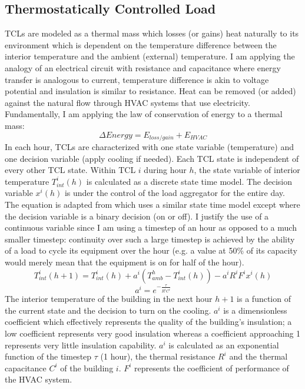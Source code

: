 \documentclass[journal]{IEEEtran}
\begin{document}
\subsection{Thermostatically Controlled Load}
TCLs are modeled as a thermal mass which losses (or gains) heat naturally to its environment which is dependent on the temperature difference between the interior temperature and the ambient (external) temperature. I am applying the analogy of an electrical circuit with resistance and capacitance where energy transfer is analogous to current, temperature difference is akin to voltage potential and insulation is similar to resistance. Heat can be removed (or added) against the natural flow through HVAC systems that use electricity. Fundamentally, I am applying the law of conservation of energy to a thermal mass:
\[\Delta Energy = E_{loss/gain}+E_{HVAC}\]
In each hour, TCLs are characterized with one state variable (temperature) and one decision variable (apply cooling if needed). Each TCL state is independent of every other TCL state. Within TCL \(i\) during hour \(h\), the state variable of  interior temperature \(T_{int}^{i}(h)\) is calculated as a discrete state time model. The decision variable \(x^i(h)\) is under the control of the load aggregator for the entire day. The equation is adapted from \cite{Cal} which uses a similar state time model except where the decision variable is a binary decision (on or off). I justify the use of a continuous variable since I am using a timestep of an hour as opposed to a much smaller timestep: continuity over such a large timestep is achieved by the ability of a load to cycle its equipment over the hour (e.g. a value at 50\% of its capacity would merely mean that the equipment is on for half of the hour).
\[ T_{int}^{i}(h+1)=T_{int}^{i}(h)+a^i(T_{amb}^{h}-T_{int}^{i}(h))-a^iR^iF^ix^i(h)\]
\[a^i=e^{-\frac{\tau}{R^iC^i}}\]
The interior temperature of the building in the next hour \(h+1\) is a function of the current state and the decision to turn on the cooling. \(a^i\) is a dimensionless coefficient which effectively represents the quality of the building's insulation; a low coefficient represents very good insulation whereas a coefficient approaching 1 represents very little insulation capability. \(a^i\) is calculated as an exponential function of the timestep \(\tau\) (1 hour), the thermal resistance \(R^i\) and the thermal capacitance \(C^i\) of the building \(i\). \(F^i\) represents the coefficient of performance of the HVAC system.
\end{document}
